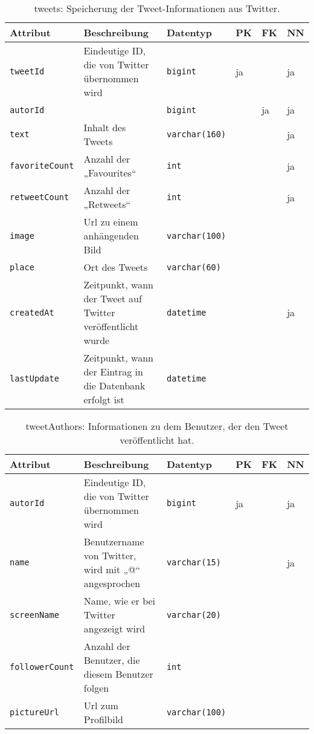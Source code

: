 \begin{table}[!ht]
\caption{tweets: Speicherung der Tweet-Informationen aus Twitter. }
  \begin{tabular}{p{3cm}p{5cm}p{2cm}p{1cm}p{1cm}p{1cm}}
    \toprule 
    \textbf{Attribut} & \textbf{Beschreibung} & \textbf{Datentyp} & \textbf{PK} & \textbf{FK} & \textbf{NN} \\
    \hline 
    \texttt{tweetId} & Eindeutige ID, die von Twitter übernommen wird & \texttt{bigint} & ja && ja   \\
    \texttt{autorId} &  & \texttt{bigint} & & ja & ja   \\
    \texttt{text} & Inhalt des Tweets  & \texttt{varchar(160)} & & & ja   \\
    \texttt{favoriteCount} & Anzahl der „Favourites“  & \texttt{int} & & & ja   \\
    \texttt{retweetCount} & Anzahl der „Retweets“ & \texttt{int} & & & ja   \\
    \texttt{image} & Url zu einem anhängenden Bild & \texttt{varchar(100)} & & &   \\
    \texttt{place} & Ort des Tweets & \texttt{varchar(60)} & & &   \\
    \texttt{createdAt} & Zeitpunkt, wann der Tweet auf Twitter veröffentlicht wurde & \texttt{datetime} & & & ja   \\
    \texttt{lastUpdate} & Zeitpunkt, wann der Eintrag in die Datenbank erfolgt ist & \texttt{datetime} & & &   \\
	\bottomrule
  \end{tabular}
\end{table}

\begin{table}[!ht]
\caption{tweetAuthors: Informationen zu dem Benutzer, der den Tweet veröffentlicht hat. }
  \begin{tabular}{p{3cm}p{5cm}p{2cm}p{1cm}p{1cm}p{1cm}}
    \toprule 
    \textbf{Attribut} & \textbf{Beschreibung} & \textbf{Datentyp} & \textbf{PK} & \textbf{FK} & \textbf{NN} \\
    \hline 
    \texttt{autorId} & Eindeutige ID, die von Twitter übernommen wird & \texttt{bigint} & ja && ja   \\
    \texttt{name} & Benutzername von Twitter, wird mit „@“ angesprochen & \texttt{varchar(15)} & & & ja   \\
    \texttt{screenName} & Name, wie er bei Twitter angezeigt wird  & \texttt{varchar(20)} & & &   \\
    \texttt{followerCount } & Anzahl der Benutzer, die diesem Benutzer folgen   & \texttt{int} & & &   \\
    \texttt{pictureUrl} & Url zum Profilbild & \texttt{varchar(100)} & & &   \\
    	\bottomrule
  \end{tabular}
\end{table}
      
